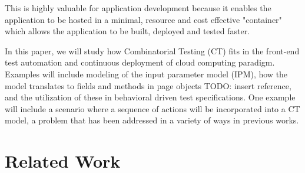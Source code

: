 \documentclass[conference]{IEEEtran}
\newcommand{\todo}[1]{}
\renewcommand{\todo}[1]{{\color{red} TODO: {#1}}}
\begin{document}
This is highly valuable for application development because it enables the application to be hosted in a minimal, resource and cost effective "container" which 
allows the application to be built, deployed and tested faster.

In this paper, we will study how Combinatorial Testing (CT) fits in the front-end test automation and continuous deployment of cloud computing paradigm.
Examples will include modeling of the input parameter model (IPM), how the model translates to fields and methods in page objects \todo{insert reference}, 
and the utilization of these in behavioral driven test specifications.
One example will include a scenario where a sequence of actions will be incorporated into a CT model, a problem that has been addressed in a variety of ways in previous works.

\section{Related Work}
\end{document}
